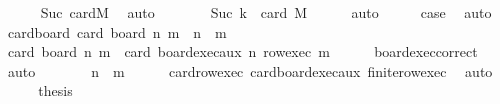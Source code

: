 \begin{isabellebody}
\ \ \ \ \isamarkupfalse%
\ Suc\ card{\isacharunderscore}{\kern0pt}M\ \isamarkupfalse%
\ auto\isanewline
\ \ \isamarkupfalse%
\ \isamarkupfalse%
\ {\isachardoublequoteopen}{\isachardot}{\kern0pt}{\isachardot}{\kern0pt}{\isachardot}{\kern0pt}\ {\isacharequal}{\kern0pt}\ {\isacharparenleft}{\kern0pt}Suc\ k{\isacharparenright}{\kern0pt}\ {\isacharasterisk}{\kern0pt}\ card\ M{\isachardoublequoteclose}\isanewline
\ \ \ \ \isamarkupfalse%
\ auto\isanewline
\ \ \isamarkupfalse%
\ \isamarkupfalse%
\ {\isacharquery}{\kern0pt}case\ \isacommand{{\isachardot}{\kern0pt}}\isamarkupfalse%
\isanewline
{}\isamarkupfalse%
\ auto%
\endisatagproof
{\isafoldproof}%
%
\isadelimproof
\isanewline
%
\endisadelimproof
\isanewline
{}\isamarkupfalse%
\ card{\isacharunderscore}{\kern0pt}board{\isacharcolon}{\kern0pt}\ {\isachardoublequoteopen}card\ {\isacharparenleft}{\kern0pt}board\ n\ m{\isacharparenright}{\kern0pt}\ {\isacharequal}{\kern0pt}\ n\ {\isacharasterisk}{\kern0pt}\ m{\isachardoublequoteclose}\isanewline
%
\isadelimproof
%
\endisadelimproof
%
\isatagproof
{}\isamarkupfalse%
\ {\isacharminus}{\kern0pt}\isanewline
\ \ \isamarkupfalse%
\ {\isachardoublequoteopen}card\ {\isacharparenleft}{\kern0pt}board\ n\ m{\isacharparenright}{\kern0pt}\ {\isacharequal}{\kern0pt}\ card\ {\isacharparenleft}{\kern0pt}board{\isacharunderscore}{\kern0pt}exec{\isacharunderscore}{\kern0pt}aux\ n\ {\isacharparenleft}{\kern0pt}row{\isacharunderscore}{\kern0pt}exec\ m{\isacharparenright}{\kern0pt}{\isacharparenright}{\kern0pt}{\isachardoublequoteclose}\isanewline
\ \ \ \ \isamarkupfalse%
\ board{\isacharunderscore}{\kern0pt}exec{\isacharunderscore}{\kern0pt}correct\ \isamarkupfalse%
\ auto\isanewline
\ \ \isamarkupfalse%
\ \isamarkupfalse%
\ {\isachardoublequoteopen}{\isachardot}{\kern0pt}{\isachardot}{\kern0pt}{\isachardot}{\kern0pt}\ {\isacharequal}{\kern0pt}\ n\ {\isacharasterisk}{\kern0pt}\ m{\isachardoublequoteclose}\isanewline
\ \ \ \ \isamarkupfalse%
\ card{\isacharunderscore}{\kern0pt}row{\isacharunderscore}{\kern0pt}exec\ card{\isacharunderscore}{\kern0pt}board{\isacharunderscore}{\kern0pt}exec{\isacharunderscore}{\kern0pt}aux\ finite{\isacharunderscore}{\kern0pt}row{\isacharunderscore}{\kern0pt}exec\ \isamarkupfalse%
\ auto\isanewline
\ \ \isamarkupfalse%
\ \isamarkupfalse%
\ {\isacharquery}{\kern0pt}thesis\ \isacommand{{\isachardot}{\kern0pt}}\isamarkupfalse%

\end{isabellebody}
